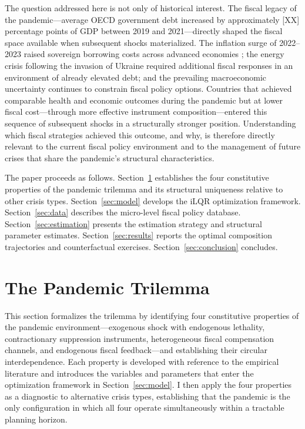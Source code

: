 \documentclass[12pt, a4paper]{article}
\begin{document}

The question addressed here is not only of historical interest. The fiscal legacy of
the pandemic---average OECD government debt increased by approximately \textsc{[XX]}
percentage points of GDP between 2019 and 2021---directly shaped the fiscal space
available when subsequent shocks materialized. The inflation surge of 2022--2023
raised sovereign borrowing costs across advanced economies \citep{jorda2023}; the
energy crisis following the invasion of Ukraine required additional fiscal responses in
an environment of already elevated debt; and the prevailing macroeconomic uncertainty
continues to constrain fiscal policy options. Countries that achieved comparable
health and economic outcomes during the pandemic but at lower fiscal cost---through
more effective instrument composition---entered this sequence of subsequent shocks in
a structurally stronger position. Understanding which fiscal strategies achieved this
outcome, and why, is therefore directly relevant to the current fiscal policy
environment and to the management of future crises that share the pandemic's
structural characteristics.


The paper proceeds as follows. Section~\ref{sec:trilemma} establishes the four
constitutive properties of the pandemic trilemma and its structural uniqueness relative
to other crisis types. Section~\ref{sec:model} develops the iLQR optimization
framework. Section~\ref{sec:data} describes the micro-level fiscal policy database.
Section~\ref{sec:estimation} presents the estimation strategy and structural parameter
estimates. Section~\ref{sec:results} reports the optimal composition trajectories and
counterfactual exercises. Section~\ref{sec:conclusion} concludes.

\section{The Pandemic Trilemma}
\label{sec:trilemma}

This section formalizes the trilemma by identifying four constitutive properties of the pandemic environment---exogenous shock with endogenous lethality, contractionary suppression instruments, heterogeneous fiscal compensation channels, and endogenous fiscal feedback---and establishing their circular interdependence. Each property is developed with reference to the empirical literature and introduces the variables and parameters that enter the optimization framework in Section~\ref{sec:model}. I then apply the four properties as a
diagnostic to alternative crisis types, establishing that the pandemic is the only configuration in which all four operate simultaneously within a tractable planning horizon.
\end{document}
